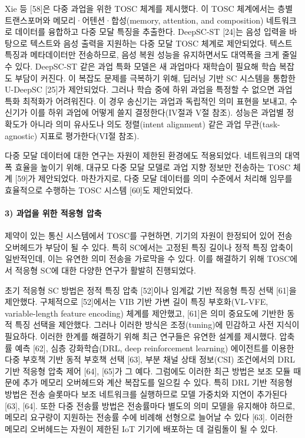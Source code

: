 Xie 등 [58]은 다중 과업을 위한 TOSC 체계를 제시했다.
이 TOSC 체계에서는 층별 트랜스포머와 메모리·어텐션·합성(memory, attention, and composition) 네트워크로 데이터를 융합하고 다중 모달 특징을 추출한다.
DeepSC-ST [24]는 음성 입력을 바탕으로 텍스트와 음성 출력을 지원하는 다중 모달 TOSC 체계로 제안되었다.
텍스트 특징과 메타데이터만 전송하므로, 음성 복원 성능을 유지하면서도 대역폭을 크게 줄일 수 있다.
DeepSC-ST 같은 과업 특화 모델은 새 과업마다 재학습이 필요해 학습 복잡도 부담이 커진다.
이 복잡도 문제를 극복하기 위해, 딥러닝 기반 SC 시스템을 통합한 U-DeepSC [25]가 제안되었다.
그러나 학습 중에 하위 과업을 특정할 수 없으면 과업 특화 최적화가 어려워진다.
이 경우 송신기는 과업과 독립적인 의미 표현을 보내고, 수신기가 이를 하위 과업에 어떻게 쓸지 결정한다(IV절과 V절 참조).
성능은 과업별 정확도가 아니라 의미 유사도나 의도 정렬(intent alignment) 같은 과업 무관(task-agnostic) 지표로 평가한다(VI절 참조).

다중 모달 데이터에 대한 연구는 자원이 제한된 환경에도 적용되었다.
네트워크의 대역폭 효율을 높이기 위해, 대규모 다중 모달 모델로 과업 지향 정보만 전송하는 TOSC 체계 [59]가 제안되었다.
마찬가지로, 다중 모달 데이터를 의미 수준에서 처리해 임무를 효율적으로 수행하는 TOSC 시스템 [60]도 제안되었다.

\paragraph{3) 과업을 위한 적응형 압축}
제약이 있는 통신 시스템에서 TOSC를 구현하면, 기기의 자원이 한정되어 있어 전송 오버헤드가 부담이 될 수 있다.
특히 SC에서는 고정된 특징 길이나 정적 특징 압축이 일반적인데, 이는 유연한 의미 전송을 가로막을 수 있다.
이를 해결하기 위해 TOSC에서 적응형 SC에 대한 다양한 연구가 활발히 진행되었다.

초기 적응형 SC 방법은 정적 특징 압축 [52]이나 임계값 기반 적응형 특징 선택 [61]을 제안했다.
구체적으로 [52]에서는 VIB 기반 가변 길이 특징 부호화(VL-VFE, variable-length feature encoding) 체계를 제안했고, [61]은 의미 중요도에 기반한 동적 특징 선택을 제안했다.
그러나 이러한 방식은 조정(tuning)에 민감하고 사전 지식이 필요하다.
이러한 한계를 해결하기 위해 최근 연구들은 유연한 설계를 제시했다. 압축률 예측 [62], 심층 강화학습(DRL, deep reinforcement learning) 에이전트를 이용한 다중 부호책 기반 동적 부호책 선택 [63], 부분 채널 상태 정보(CSI) 조건에서의 DRL 기반 적응형 압축 제어 [64], [65]가 그 예다.
그럼에도 이러한 최근 방법은 보조 모듈 때문에 추가 메모리 오버헤드와 계산 복잡도를 일으킬 수 있다.
특히 DRL 기반 적응형 방법은 전송 슬롯마다 보조 네트워크를 실행하므로 모델 가중치와 지연이 추가된다 [63], [64].
또한 다중 전송률 방법은 전송률마다 별도의 의미 모델을 유지해야 하므로, 메모리 요구량이 지원하는 전송률 수에 비례해 선형으로 늘어날 수 있다 [63].
이러한 메모리 오버헤드는 자원이 제한된 IoT 기기에 배포하는 데 걸림돌이 될 수 있다.


